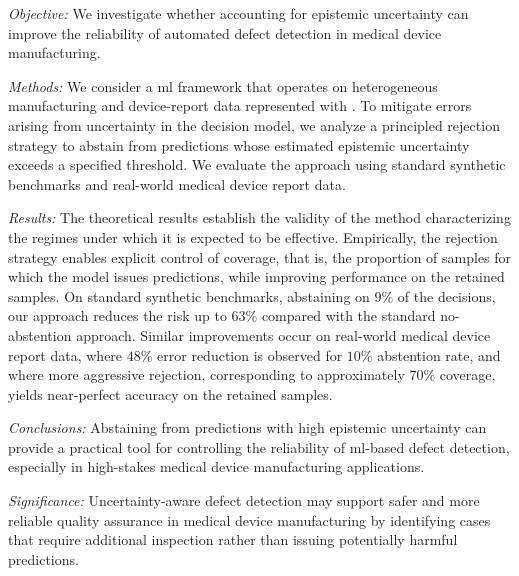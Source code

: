 \textit{Objective:} We investigate whether accounting for epistemic uncertainty can improve the reliability of automated defect detection in medical device manufacturing.

\textit{Methods:} We consider a \acrlong*{ml} framework that operates on heterogeneous manufacturing and device-report data %
represented with . To mitigate errors arising from uncertainty in the decision model, we analyze a principled rejection strategy to abstain from predictions whose estimated epistemic uncertainty exceeds a specified threshold. We evaluate the approach using standard synthetic benchmarks and real-world medical device report data.

\textit{Results:} The theoretical results establish the validity of the method characterizing the regimes 
under which it is expected to be effective. Empirically, the rejection strategy enables explicit control of coverage, that is, the proportion of samples for which the model issues predictions, while improving performance on the retained samples. On standard synthetic benchmarks, abstaining on
\(
9\%\) of the decisions, our approach reduces the risk up to \(
63\%\) compared with the standard no-abstention approach. Similar improvements occur on real-world medical device report data, where \(
48\%\) error reduction is observed for \(10\%\) abstention rate, and where more aggressive rejection, corresponding to approximately \(70\%\) coverage, yields near-perfect accuracy on the retained samples.

\textit{Conclusions:} Abstaining from predictions with high epistemic uncertainty can provide a practical tool for controlling the reliability of \acrlong*{ml}-based defect detection, 
especially in high-stakes medical device manufacturing applications.

\textit{Significance:} Uncertainty-aware defect detection may support safer and more reliable quality assurance in medical device manufacturing by identifying cases that require additional inspection rather than issuing potentially harmful predictions.


